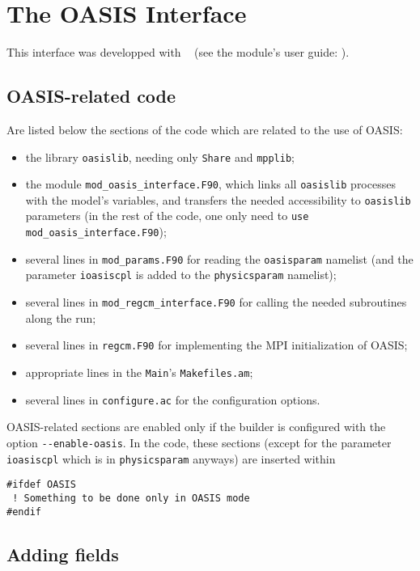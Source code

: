 \chapter{The OASIS Interface}

This interface was developped with \OA\ \citep{craig_2017} (see the module's user guide:
\cite{valcke_oasis}).

\section{OASIS-related code}

Are listed below the sections of the code which are related to the use of OASIS:
\begin{itemize}
	\item 	the library \verb=oasislib=, needing only \verb=Share= and \verb=mpplib=;
	\item 	the module \verb=mod_oasis_interface.F90=, which links all \verb=oasislib=
		processes with the model's variables, and transfers the needed
		accessibility to \verb=oasislib= parameters (in the rest of the code,
		one only need to \verb=use mod_oasis_interface.F90=);
	\item	several lines in \verb=mod_params.F90= for reading the \verb=oasisparam=
		namelist (and the parameter \verb=ioasiscpl= is added to the
		\verb=physicsparam= namelist);
	\item	several lines in \verb=mod_regcm_interface.F90= for calling the needed
		subroutines along the run;
	\item	several lines in \verb=regcm.F90= for implementing the MPI initialization
		of OASIS;
	\item	appropriate lines in the \verb=Main='s \verb=Makefiles.am=;
	\item	several lines in \verb=configure.ac= for the configuration options.
\end{itemize}

OASIS-related sections are enabled only if the builder is configured with
the option \verb=--enable-oasis=. In the code, these sections (except for the parameter
\verb=ioasiscpl= which is in \verb=physicsparam= anyways) are inserted within
\begin{verbatim}
#ifdef OASIS
 ! Something to be done only in OASIS mode
#endif
\end{verbatim}

\section{Adding fields}

